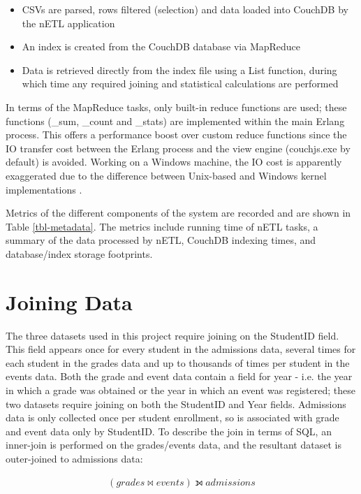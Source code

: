 \begin{itemize}
    \item CSVs are parsed, rows filtered (selection) and data loaded into CouchDB by the nETL application
    \item An index is created from the CouchDB database via MapReduce
    \item Data is retrieved directly from the index file using a List function, during which time any required joining and statistical calculations are performed
\end{itemize}

In terms of the MapReduce tasks, only built-in reduce functions are used; these functions (\_sum, \_count and \_stats) are implemented within the main Erlang process. This offers a performance boost over custom reduce functions since the IO transfer cost between the Erlang process and the view engine (couchjs.exe by default) is avoided. Working on a Windows machine, the IO cost is apparently exaggerated due to the difference between Unix-based and Windows kernel implementations \cite{slack1Nov}.

Metrics of the different components of the system are recorded and are shown in Table \ref{tbl-metadata}. The metrics include running time of nETL tasks, a summary of the data processed by nETL, CouchDB indexing times, and database/index storage footprints.



\section{Joining Data}
The three datasets used in this project require joining on the StudentID field. This field appears once for every student in the admissions data, several times for each student in the grades data and up to thousands of times per student in the events data. Both the grade and event data contain a field for year - i.e. the year in which a grade was obtained or the year in which an event was registered; these two datasets require joining on both the StudentID and Year fields. Admissions data is only collected once per student enrollment, so is associated with grade and event data only by StudentID. To describe the join in terms of SQL, an inner-join is performed on the grades/events data, and the resultant dataset is outer-joined to admissions data: \begin{spreadlines}{15pt}
    \begin{gather*}
        (grades \bowtie events) \leftouterjoin admissions
    \end{gather*}
\end{spreadlines}


